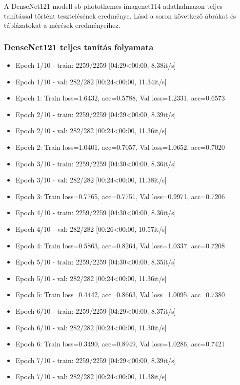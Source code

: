 A DenseNet121 modell sb-photothemes-imagenet114 adathalmazon teljes tanítással történt tesztelésének eredménye. Lásd a soron következő ábrákat és táblázatokat a mérések eredményeihez.

\subsubsection{DenseNet121 teljes tanítás folyamata}
\begin{itemize} 
  \item Epoch 1/10 - train: 2259/2259 [04:29<00:00,  8.38it/s]
  \item Epoch 1/10 - val: 282/282 [00:24<00:00, 11.34it/s]
  \item Epoch 1: Train loss=1.6432, acc=0.5788, Val loss=1.2331, acc=0.6573
  \item Epoch 2/10 - train: 2259/2259 [04:29<00:00,  8.39it/s]
  \item Epoch 2/10 - val: 282/282 [00:24<00:00, 11.36it/s]
  \item Epoch 2: Train loss=1.0401, acc=0.7057, Val loss=1.0652, acc=0.7020
  \item Epoch 3/10 - train: 2259/2259 [04:30<00:00,  8.36it/s]
  \item Epoch 3/10 - val: 282/282 [00:24<00:00, 11.38it/s]
  \item Epoch 3: Train loss=0.7765, acc=0.7751, Val loss=0.9971, acc=0.7206
  \item Epoch 4/10 - train: 2259/2259 [04:30<00:00,  8.36it/s]
  \item Epoch 4/10 - val: 282/282 [00:26<00:00, 10.57it/s]
  \item Epoch 4: Train loss=0.5863, acc=0.8264, Val loss=1.0337, acc=0.7208
  \item Epoch 5/10 - train: 2259/2259 [04:30<00:00,  8.35it/s]
  \item Epoch 5/10 - val: 282/282 [00:24<00:00, 11.36it/s]
  \item Epoch 5: Train loss=0.4442, acc=0.8663, Val loss=1.0095, acc=0.7380
  \item Epoch 6/10 - train: 2259/2259 [04:29<00:00,  8.37it/s]
  \item Epoch 6/10 - val: 282/282 [00:24<00:00, 11.30it/s]
  \item Epoch 6: Train loss=0.3490, acc=0.8949, Val loss=1.0286, acc=0.7421
  \item Epoch 7/10 - train: 2259/2259 [04:29<00:00,  8.39it/s]
  \item Epoch 7/10 - val: 282/282 [00:24<00:00, 11.38it/s]

\end{itemize}
